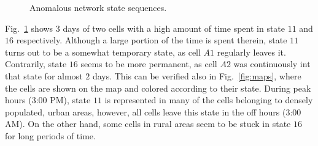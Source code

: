 			\begin{figure}[ht]
				\centering
				\caption[Anomalous network state sequences]{Anomalous network state sequences.}
				\label{fig:lines_zoom}
			\end{figure}
			
			Fig.~\ref{fig:lines_zoom} shows $3$ days of two cells with a high amount of time spent in state $11$ and $16$ respectively.
			Although a large portion of the time is spent therein, state $11$ turns out to be a somewhat temporary state, as cell $A1$ regularly leaves it.
			Contrarily, state $16$ seems to be more permanent, as cell $A2$ was continuously int that state for almost $2$ days.
			This can be verified also in Fig.~\ref{fig:maps}, where the cells are shown on the map and colored according to their state.
			During peak hours (3:00 PM), state $11$ is represented in many of the cells belonging to densely populated, urban areas, however, all cells leave this state in the off hours (3:00 AM).
			On the other hand, some cells in rural areas seem to be stuck in state $16$ for long periods of time.
			
